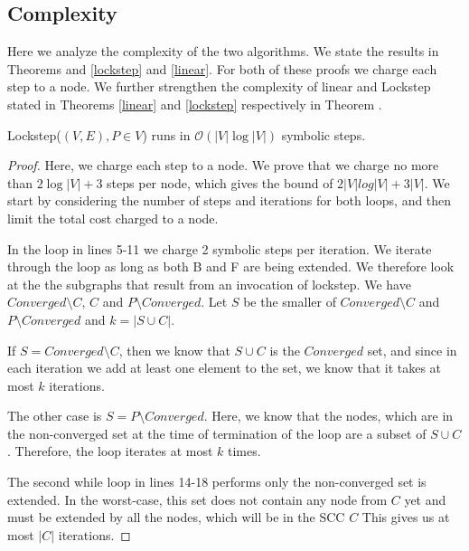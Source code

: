 \documentclass[../master/master.tex]{subfiles}
\begin{document}
\subsection{Complexity}
Here we analyze the complexity of the two algorithms. We state the results in Theorems  and \ref{lockstep} and \ref{linear}. For both of these proofs we charge each step to a node. We further strengthen the complexity of linear and Lockstep stated in Theorems \ref{linear} and \ref{lockstep} respectively in Theorem \label{linear-strengthened}.

\begin{theorem}\label{lockstep} Lockstep($(V, E), P\in V$) runs in $\mathcal{O}(|V|\log |V|)$ symbolic steps.
\end{theorem}
\begin{proof}
  Here, we charge each step to a node. We prove that we charge no more than $2 \log |V|+3$ steps per node, which gives the bound of $2|V|log|V|+3|V|$. We start by considering the number of steps and iterations for both loops, and then limit the total cost charged to a node.

  In the loop in lines 5-11 we charge 2 symbolic steps per iteration. We iterate through the loop as long as both B and F are being extended. We therefore look at the the subgraphs that result from an invocation of lockstep. We have $Converged\setminus C$, $C$ and $P\setminus Converged$. Let $S$ be the smaller of $Converged\setminus C$ and $P\setminus Converged$ and $k = |S\cup C|$.

  If $S = Converged\setminus C$, then we know that $S\cup C$ is the $Converged$ set, and since in each iteration we add at least one element to the set, we know that it takes at most $k$ iterations.

  The other case is $S=P\setminus Converged$. Here, we know that the nodes, which are in the non-converged set at the time of termination of the loop are a subset of $S\cup C$. Therefore, the loop iterates at most $k$ times.

  The second while loop in lines 14-18 performs only the non-converged set is extended. In the worst-case, this set does not contain any node from $C$ yet and must be extended by all the nodes, which will be in the SCC $C$ This gives us at most $|C|$ iterations.


\end{proof}
\end{document}
